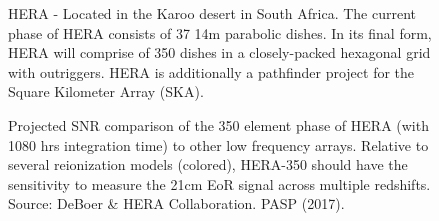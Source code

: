 \documentclass[a0,landscape]{a0poster}
\begin{document}
\begin{multicols}{4}
\begin{figure}[H]
\centering
\label{fig:HERA}
\caption{HERA - Located in the Karoo desert in South Africa. The current phase of HERA consists of 37 14m parabolic dishes. In its final form, HERA will comprise of 350 dishes in a closely-packed hexagonal grid with outriggers. HERA is additionally a pathfinder project for the Square Kilometer Array (SKA).}
\end{figure}

\begin{figure}[H]
\centering
{}
\caption{Projected SNR comparison of the 350 element phase of HERA (with 1080 hrs integration time) to other low frequency arrays. Relative to several reionization models (colored), HERA-350
should have the sensitivity to measure the 21cm EoR signal across multiple redshifts. Source: DeBoer \& HERA Collaboration. PASP (2017).}
\label{fig:HERAsense}
\end{figure}


\end{multicols}
\end{document}
